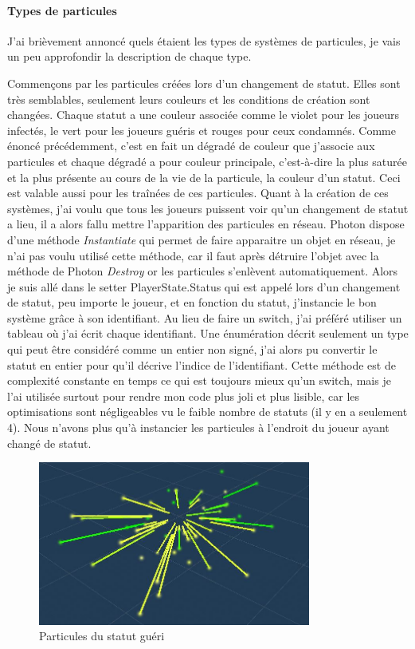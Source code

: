 \documentclass{article}
\begin{document}
\paragraph{Types de particules}


J'ai brièvement annoncé quels étaient les types de systèmes de particules, je vais un peu approfondir la description de chaque type.


Commençons par les particules créées lors d'un changement de statut. Elles sont très semblables, seulement leurs couleurs et les conditions de création sont changées. Chaque statut a une couleur associée comme le violet pour les joueurs infectés, le vert pour les joueurs guéris et rouges pour ceux condamnés. Comme énoncé précédemment, c'est en fait un dégradé de couleur que j'associe aux particules et chaque dégradé a pour couleur principale, c'est-à-dire la plus saturée et la plus présente au cours de la vie de la particule, la couleur d'un statut. Ceci est valable aussi pour les traînées de ces particules. Quant à la création de ces systèmes, j'ai voulu que tous les joueurs puissent voir qu'un changement de statut a lieu, il a alors fallu mettre l'apparition des particules en réseau. Photon dispose d'une méthode \emph{Instantiate} qui permet de faire apparaitre un objet en réseau, je n'ai pas voulu utilisé cette méthode, car il faut après détruire l'objet avec la méthode de Photon \emph{Destroy} or les particules s'enlèvent automatiquement. Alors je suis allé dans le setter PlayerState.Status qui est appelé lors d'un changement de statut, peu importe le joueur, et en fonction du statut, j'instancie le bon système grâce à son identifiant. Au lieu de faire un switch, j'ai préféré utiliser un tableau où j'ai écrit chaque identifiant. Une énumération décrit seulement un type qui peut être considéré comme un entier non signé, j'ai alors pu convertir le statut en entier pour qu'il décrive l'indice de l'identifiant. Cette méthode est de complexité constante en temps ce qui est toujours mieux qu'un switch, mais je l'ai utilisée surtout pour rendre mon code plus joli et plus lisible, car les optimisations sont négligeables vu le faible nombre de statuts (il y en a seulement 4). Nous n'avons plus qu'à instancier les particules à l'endroit du joueur ayant changé de statut.


\begin{figure}[H]
\centering
\includegraphics[width=0.8\textwidth]{cc/particles_healed.JPG}
\caption{Particules du statut guéri}
\label{Particules du status guéris}
\end{figure}
\end{document}
